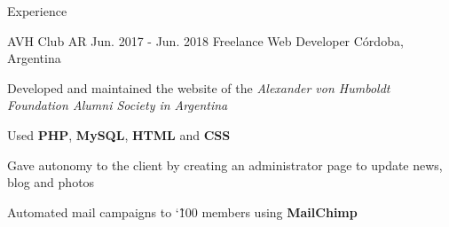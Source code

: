 \documentclass{curriculum}
\begin{document}
\begin{cvsection}{Experience}

    \makesectionitemheader
        {AVH Club AR} {Jun. 2017 - Jun. 2018}
        {Freelance Web Developer} {Córdoba, Argentina}
        \begin{sectionitemlist}
        \item{Developed and maintained the website of the \textit{Alexander von Humboldt Foundation Alumni Society in Argentina}}
        \item{Used \textbf{PHP}, \textbf{MySQL}, \textbf{HTML} and \textbf{CSS}}
        \item{Gave autonomy to the client by creating an administrator page to update news, blog and photos}
        \item{Automated mail campaigns to  \char`\~ 100 members using \textbf{MailChimp}}
        \end{sectionitemlist}

\end{cvsection}



\end{document}
